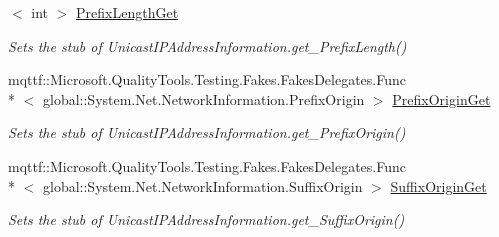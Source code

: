 \begin{DoxyCompactItemize}
$<$ int $>$ \hyperlink{class_system_1_1_net_1_1_network_information_1_1_fakes_1_1_stub_unicast_i_p_address_information_a111aec9d9467caef4765153ddef4436d}{Prefix\-Length\-Get}
\begin{DoxyCompactList}\small\item\em Sets the stub of Unicast\-I\-P\-Address\-Information.\-get\-\_\-\-Prefix\-Length()\end{DoxyCompactList}\item 
mqttf\-::\-Microsoft.\-Quality\-Tools.\-Testing.\-Fakes.\-Fakes\-Delegates.\-Func\\*
$<$ global\-::\-System.\-Net.\-Network\-Information.\-Prefix\-Origin $>$ \hyperlink{class_system_1_1_net_1_1_network_information_1_1_fakes_1_1_stub_unicast_i_p_address_information_a7c03655fc9b3841457b9a5eb790859cc}{Prefix\-Origin\-Get}
\begin{DoxyCompactList}\small\item\em Sets the stub of Unicast\-I\-P\-Address\-Information.\-get\-\_\-\-Prefix\-Origin()\end{DoxyCompactList}\item 
mqttf\-::\-Microsoft.\-Quality\-Tools.\-Testing.\-Fakes.\-Fakes\-Delegates.\-Func\\*
$<$ global\-::\-System.\-Net.\-Network\-Information.\-Suffix\-Origin $>$ \hyperlink{class_system_1_1_net_1_1_network_information_1_1_fakes_1_1_stub_unicast_i_p_address_information_ad499dadf3966078bbb62812c79cc1219}{Suffix\-Origin\-Get}
\begin{DoxyCompactList}\small\item\em Sets the stub of Unicast\-I\-P\-Address\-Information.\-get\-\_\-\-Suffix\-Origin()\end{DoxyCompactList}\end{DoxyCompactItemize}
